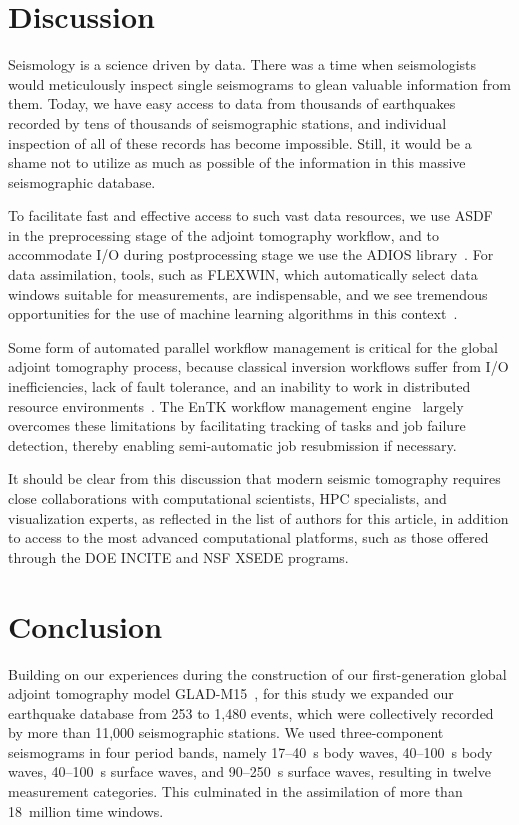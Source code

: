 \documentclass[extra,mreferee]{gji}
\begin{document}
\section{Discussion}

Seismology is a science driven by data.
There was a time when seismologists would meticulously inspect single seismograms to glean valuable information from them.
Today, we have easy access to data from thousands of earthquakes recorded by tens of thousands of seismographic stations, and individual inspection of all of these records has become impossible.
Still, it would be a shame not to utilize as much as possible of the information in this massive seismographic database.

To facilitate fast and effective access to such vast data resources,
we use ASDF~\citep{krischer2016adaptable} in the preprocessing stage of the adjoint tomography workflow,
and to accommodate I/O during postprocessing stage we use the ADIOS library~\citep{liu2014hello}.
For data assimilation,
tools, such as FLEXWIN, which automatically select data windows suitable for measurements,
are indispensable, and we see tremendous opportunities for the use of machine learning algorithms in this context~\citep[e.g.,][]{chen2017}.

Some form of automated parallel workflow management is critical for the global adjoint tomography process,
because classical inversion workflows suffer from I/O inefficiencies, lack of fault tolerance, and an inability to work in distributed resource environments~\citep{Lefebvre2018}.
The EnTK workflow management engine~\citep{EnTK2017}
largely overcomes these limitations by facilitating tracking of tasks and job failure detection,
thereby enabling semi-automatic job resubmission if necessary.

It should be clear from this discussion that modern seismic tomography requires close collaborations with computational scientists, HPC specialists, and visualization experts,
as reflected in the list of authors for this article, in addition to access to the most advanced computational platforms,
such as those offered through the DOE INCITE and NSF XSEDE programs.

\section{Conclusion}

Building on our experiences during the construction of our first-generation global adjoint tomography model GLAD-M15~\citep{bozdaug2016global},
for this study we expanded our earthquake database from 253 to 1,480 events,
which were collectively recorded by more than 11,000 seismographic stations.
We used three-component seismograms in four period bands,
namely 17--40~s body waves, 40--100~s body waves, 40--100~s surface waves, and 90--250~s surface waves,
resulting in twelve measurement categories.
This culminated in the assimilation of more than 18~million time windows.
\end{document}
